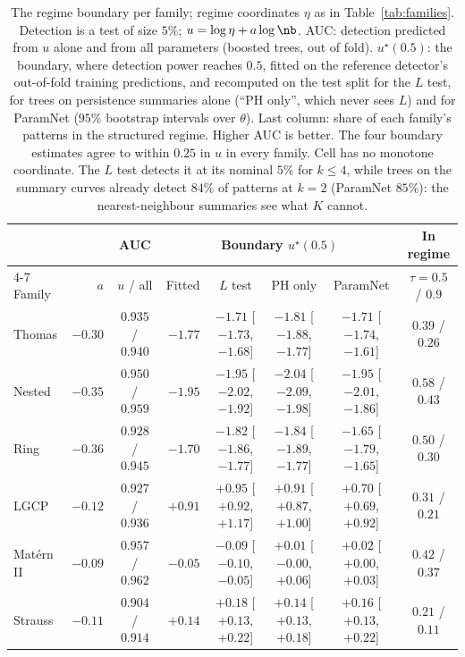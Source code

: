 \begin{table}[t]
\caption{The regime boundary per family; regime coordinates $\eta$ as in Table~\ref{tab:families}. Detection is a
test of size $5\%$; $u=\log\eta+a\log\nb$. AUC: detection predicted from $u$ alone and from all parameters (boosted
trees, out of fold). $u^\star(0.5)$: the boundary, where detection power reaches $0.5$, fitted on the reference
detector's out-of-fold training predictions, and recomputed on the test split for the $L$ test, for trees on
persistence summaries alone (``PH only'', which never sees $L$) and for ParamNet ($95\%$ bootstrap intervals over
$\theta$). Last column: share of each family's patterns in the structured regime. Higher AUC is better. The four
boundary estimates agree to within $0.25$ in $u$ in every family. Cell has no monotone coordinate. The $L$ test
detects it at its nominal $5\%$ for $k\le4$, while trees on the summary curves already detect $84\%$ of patterns at
$k=2$ (ParamNet $85\%$): the nearest-neighbour summaries see what $K$ cannot.}
\label{tab:regime}
\begin{center}
\footnotesize
\setlength{\tabcolsep}{4pt}
\begin{tabular}{@{}lrcrcccc@{}}
\toprule
& & AUC & \multicolumn{4}{c}{Boundary $u^\star(0.5)$} & In regime \\
\cmidrule(lr){4-7}
Family & $a$ & $u$ / all & Fitted & $L$ test & PH only & ParamNet & $\tau=0.5$ / $0.9$ \\
\midrule
Thomas      & $-0.30$ & $0.935$ / $0.940$ & $-1.77$ & $-1.71$ {\scriptsize[$-1.73$, $-1.68$]} & $-1.81$ {\scriptsize[$-1.88$, $-1.77$]} & $-1.71$ {\scriptsize[$-1.74$, $-1.61$]} & $0.39$ / $0.26$ \\
Nested      & $-0.35$ & $0.950$ / $0.959$ & $-1.95$ & $-1.95$ {\scriptsize[$-2.02$, $-1.92$]} & $-2.04$ {\scriptsize[$-2.09$, $-1.98$]} & $-1.95$ {\scriptsize[$-2.01$, $-1.86$]} & $0.58$ / $0.43$ \\
Ring        & $-0.36$ & $0.928$ / $0.945$ & $-1.70$ & $-1.82$ {\scriptsize[$-1.86$, $-1.77$]} & $-1.84$ {\scriptsize[$-1.89$, $-1.77$]} & $-1.65$ {\scriptsize[$-1.79$, $-1.65$]} & $0.50$ / $0.30$ \\
LGCP        & $-0.12$ & $0.927$ / $0.936$ & $+0.91$ & $+0.95$ {\scriptsize[$+0.92$, $+1.17$]} & $+0.91$ {\scriptsize[$+0.87$, $+1.00$]} & $+0.70$ {\scriptsize[$+0.69$, $+0.92$]} & $0.31$ / $0.21$ \\
Mat\'ern II & $-0.09$ & $0.957$ / $0.962$ & $-0.05$ & $-0.09$ {\scriptsize[$-0.10$, $-0.05$]} & $+0.01$ {\scriptsize[$-0.00$, $+0.06$]} & $+0.02$ {\scriptsize[$+0.00$, $+0.03$]} & $0.42$ / $0.37$ \\
Strauss     & $-0.11$ & $0.904$ / $0.914$ & $+0.14$ & $+0.18$ {\scriptsize[$+0.13$, $+0.22$]} & $+0.14$ {\scriptsize[$+0.13$, $+0.18$]} & $+0.16$ {\scriptsize[$+0.13$, $+0.22$]} & $0.21$ / $0.11$ \\
\bottomrule
\end{tabular}
\end{center}
\end{table}


